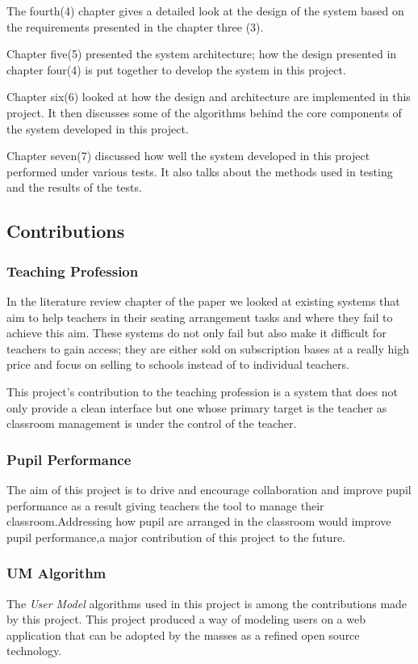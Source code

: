  The fourth(4) chapter gives a detailed look at the design of the system based on the requirements presented in the chapter three (3). 
 
 Chapter five(5) presented the system architecture; how the design presented in chapter four(4) is put together to develop the system in this project.
 
 Chapter six(6) looked at how the design and architecture are implemented in this project. It then discusses some of the algorithms behind the core components of the system developed in this project.
 
 Chapter seven(7) discussed how well the system developed in this project performed under various tests. It also talks about the methods used in testing and the results of the tests.
\subsection{Contributions}
\subsubsection{Teaching Profession}
In the literature review chapter of the paper we looked at existing systems that aim to help teachers in their seating arrangement tasks and where they fail to achieve this aim. These systems do not only fail but also make it difficult for teachers to gain access; they are either sold on subscription bases at a really high price and focus on selling to schools instead of to individual teachers.

This project's contribution to the teaching profession is a system that does not only provide a clean interface but one whose primary target is the teacher as classroom management is under the control of the teacher.  

\subsubsection{Pupil Performance}
The aim of this project is to drive and encourage collaboration and improve pupil performance as a result giving teachers the tool to manage their classroom.Addressing how pupil are arranged in the classroom would improve pupil performance,a major contribution of this project to the future.
\subsubsection{UM Algorithm}
The \emph{User Model} algorithms used in this project is among the contributions made by this project. This project produced a way of modeling users on a web application that can be adopted by the masses as a refined open source technology.
 

